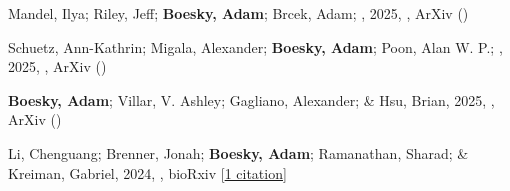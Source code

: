\item[{\color{numcolor}\scriptsize4}] Mandel, Ilya; Riley, Jeff; \textbf{Boesky, Adam}; Brcek, Adam; \etal, 2025, , ArXiv ()

\item[{\color{numcolor}\scriptsize3}] Schuetz, Ann-Kathrin; Migala, Alexander; \textbf{Boesky, Adam}; Poon, Alan W. P.; \etal, 2025, , ArXiv ()

\item[{\color{numcolor}\scriptsize2}] \textbf{Boesky, Adam}; Villar, V. Ashley; Gagliano, Alexander; \& Hsu, Brian, 2025, , ArXiv ()

\item[{\color{numcolor}\scriptsize1}] Li, Chenguang; Brenner, Jonah; \textbf{Boesky, Adam}; Ramanathan, Sharad; \& Kreiman, Gabriel, 2024, , bioRxiv [\href{https://scholar.google.com/citations?view_op=view_citation&hl=en&user=8cQgOIIAAAAJ&sortby=title&citation_for_view=8cQgOIIAAAAJ:9yKSN-GCB0IC}{1 citation}]